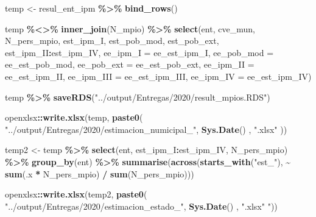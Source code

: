 \documentclass[
  12pt,
]{book}
\newenvironment{Shaded}{\begin{snugshade}}{\end{snugshade}}
\newcommand{\AttributeTok}[1]{\textcolor[rgb]{0.13,0.29,0.53}{#1}}
\newcommand{\FunctionTok}[1]{\textcolor[rgb]{0.13,0.29,0.53}{\textbf{#1}}}
\newcommand{\NormalTok}[1]{#1}
\newcommand{\OtherTok}[1]{\textcolor[rgb]{0.56,0.35,0.01}{#1}}
\newcommand{\SpecialCharTok}[1]{\textcolor[rgb]{0.81,0.36,0.00}{\textbf{#1}}}
\newcommand{\StringTok}[1]{\textcolor[rgb]{0.31,0.60,0.02}{#1}}
\begin{document}
\begin{Shaded}
\begin{Highlighting}[]
\NormalTok{temp }\OtherTok{\textless{}{-}}\NormalTok{ resul\_ent\_ipm }\SpecialCharTok{\%\textgreater{}\%} \FunctionTok{bind\_rows}\NormalTok{()}

\NormalTok{temp }\SpecialCharTok{\%\textless{}\textgreater{}\%} \FunctionTok{inner\_join}\NormalTok{(N\_mpio) }\SpecialCharTok{\%\textgreater{}\%} 
  \FunctionTok{select}\NormalTok{(ent, cve\_mun, N\_pers\_mpio, est\_ipm\_I, }
\NormalTok{         est\_pob\_mod, est\_pob\_ext, est\_ipm\_II}\SpecialCharTok{:}\NormalTok{est\_ipm\_IV,}
         \AttributeTok{ee\_ipm\_I =}\NormalTok{ ee\_est\_ipm\_I,}
         \AttributeTok{ee\_pob\_mod =}\NormalTok{ ee\_est\_pob\_mod,}
         \AttributeTok{ee\_pob\_ext =}\NormalTok{ ee\_est\_pob\_ext,}
         \AttributeTok{ee\_ipm\_II =}\NormalTok{ ee\_est\_ipm\_II,}
         \AttributeTok{ee\_ipm\_III =}\NormalTok{ ee\_est\_ipm\_III,}
         \AttributeTok{ee\_ipm\_IV =}\NormalTok{ ee\_est\_ipm\_IV)}

\NormalTok{temp }\SpecialCharTok{\%\textgreater{}\%} 
  \FunctionTok{saveRDS}\NormalTok{(}\StringTok{"../output/Entregas/2020/result\_mpios.RDS"}\NormalTok{)}

\NormalTok{openxlsx}\SpecialCharTok{::}\FunctionTok{write.xlsx}\NormalTok{(temp,}
                     \FunctionTok{paste0}\NormalTok{(}
                       \StringTok{"../output/Entregas/2020/estimacion\_numicipal\_"}\NormalTok{,}
                       \FunctionTok{Sys.Date}\NormalTok{() ,}
                       \StringTok{".xlsx"}
\NormalTok{                     ))}

\NormalTok{temp2 }\OtherTok{\textless{}{-}}\NormalTok{ temp }\SpecialCharTok{\%\textgreater{}\%}
  \FunctionTok{select}\NormalTok{(ent, est\_ipm\_I}\SpecialCharTok{:}\NormalTok{est\_ipm\_IV, N\_pers\_mpio) }\SpecialCharTok{\%\textgreater{}\%}
  \FunctionTok{group\_by}\NormalTok{(ent) }\SpecialCharTok{\%\textgreater{}\%}
  \FunctionTok{summarise}\NormalTok{(}\FunctionTok{across}\NormalTok{(}\FunctionTok{starts\_with}\NormalTok{(}\StringTok{"est\_"}\NormalTok{),}
                   \SpecialCharTok{\textasciitilde{}} \FunctionTok{sum}\NormalTok{(.x }\SpecialCharTok{*}\NormalTok{ N\_pers\_mpio) }\SpecialCharTok{/} \FunctionTok{sum}\NormalTok{(N\_pers\_mpio)))}

\NormalTok{openxlsx}\SpecialCharTok{::}\FunctionTok{write.xlsx}\NormalTok{(temp2,}
                     \FunctionTok{paste0}\NormalTok{(}
                       \StringTok{"../output/Entregas/2020/estimacion\_estado\_"}\NormalTok{,}
                       \FunctionTok{Sys.Date}\NormalTok{() ,}
                       \StringTok{".xlsx"}
                     \StringTok{"))}
\end{Highlighting}
\end{Shaded}
\end{document}
